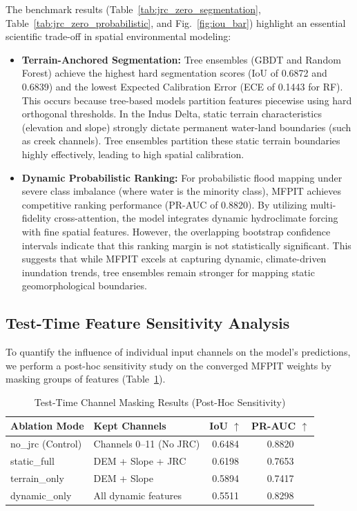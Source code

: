 \documentclass[preprint,12pt]{elsarticle}
\begin{document}
The benchmark results (Table~\ref{tab:jrc_zero_segmentation}, Table~\ref{tab:jrc_zero_probabilistic}, and Fig.~\ref{fig:iou_bar}) highlight an essential scientific trade-off in spatial environmental modeling:
\begin{itemize}
    \item \textbf{Terrain-Anchored Segmentation:} Tree ensembles (GBDT and Random Forest) achieve the highest hard segmentation scores (IoU of 0.6872 and 0.6839) and the lowest Expected Calibration Error (ECE of 0.1443 for RF). This occurs because tree-based models partition features piecewise using hard orthogonal thresholds. In the Indus Delta, static terrain characteristics (elevation and slope) strongly dictate permanent water-land boundaries (such as creek channels). Tree ensembles partition these static terrain boundaries highly effectively, leading to high spatial calibration.
    \item \textbf{Dynamic Probabilistic Ranking:} For probabilistic flood mapping under severe class imbalance (where water is the minority class), MFPIT achieves competitive ranking performance (PR-AUC of 0.8820). By utilizing multi-fidelity cross-attention, the model integrates dynamic hydroclimate forcing with fine spatial features. However, the overlapping bootstrap confidence intervals indicate that this ranking margin is not statistically significant. This suggests that while MFPIT excels at capturing dynamic, climate-driven inundation trends, tree ensembles remain stronger for mapping static geomorphological boundaries.
\end{itemize}

\subsection{Test-Time Feature Sensitivity Analysis}
To quantify the influence of individual input channels on the model's predictions, we perform a post-hoc sensitivity study on the converged MFPIT weights by masking groups of features (Table~\ref{tab:test_time_sensitivity}).

\begin{table}[htbp]
\caption{Test-Time Channel Masking Results (Post-Hoc Sensitivity)}
\label{tab:test_time_sensitivity}
\centering
\begin{tabular}{llcc}
\toprule
\textbf{Ablation Mode} & \textbf{Kept Channels} & \textbf{IoU $\uparrow$} & \textbf{PR-AUC $\uparrow$} \\
\midrule
no\_jrc (Control) & Channels 0--11 (No JRC) & 0.6484 & 0.8820 \\
static\_full & DEM + Slope + JRC & 0.6198 & 0.7653 \\
terrain\_only & DEM + Slope & 0.5894 & 0.7417 \\
dynamic\_only & All dynamic features & 0.5511 & 0.8298 \\
\bottomrule
\end{tabular}
\end{table}
\end{document}
